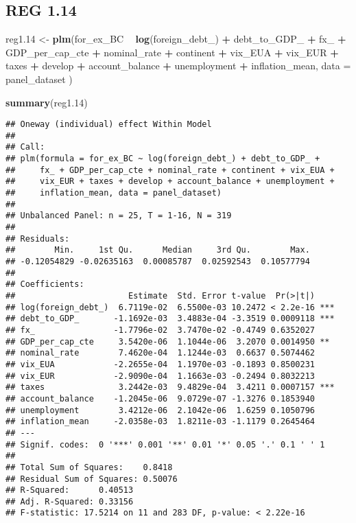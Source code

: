 \documentclass[]{article}
\newenvironment{Shaded}{\begin{snugshade}}{\end{snugshade}}
\newcommand{\KeywordTok}[1]{\textcolor[rgb]{0.13,0.29,0.53}{\textbf{#1}}}
\newcommand{\DataTypeTok}[1]{\textcolor[rgb]{0.13,0.29,0.53}{#1}}
\newcommand{\DecValTok}[1]{\textcolor[rgb]{0.00,0.00,0.81}{#1}}
\newcommand{\StringTok}[1]{\textcolor[rgb]{0.31,0.60,0.02}{#1}}
\newcommand{\OperatorTok}[1]{\textcolor[rgb]{0.81,0.36,0.00}{\textbf{#1}}}
\newcommand{\NormalTok}[1]{#1}
\begin{document}
\subsection{REG 1.14}\label{reg-1.14}

\begin{Shaded}
\begin{Highlighting}[]
\NormalTok{reg1.}\DecValTok{14}\NormalTok{ <-}\StringTok{ }\KeywordTok{plm}\NormalTok{(for_ex_BC }\OperatorTok{~}\StringTok{ }\KeywordTok{log}\NormalTok{(foreign_debt_) }\OperatorTok{+}\StringTok{ }\NormalTok{debt_to_GDP_ }\OperatorTok{+}\StringTok{ }\NormalTok{fx_ }\OperatorTok{+}\StringTok{ }\NormalTok{GDP_per_cap_cte }\OperatorTok{+}\StringTok{ }\NormalTok{nominal_rate }\OperatorTok{+}\StringTok{ }\NormalTok{continent }\OperatorTok{+}\StringTok{ }\NormalTok{vix_EUA }\OperatorTok{+}\StringTok{ }\NormalTok{vix_EUR }\OperatorTok{+}\StringTok{ }\NormalTok{taxes }\OperatorTok{+}\StringTok{ }\NormalTok{develop }\OperatorTok{+}\StringTok{ }\NormalTok{account_balance }\OperatorTok{+}\StringTok{ }\NormalTok{unemployment }\OperatorTok{+}\StringTok{ }\NormalTok{inflation_mean, }\DataTypeTok{data =}\NormalTok{ panel_dataset )}

\KeywordTok{summary}\NormalTok{(reg1.}\DecValTok{14}\NormalTok{)}
\end{Highlighting}
\end{Shaded}

\begin{verbatim}
## Oneway (individual) effect Within Model
## 
## Call:
## plm(formula = for_ex_BC ~ log(foreign_debt_) + debt_to_GDP_ + 
##     fx_ + GDP_per_cap_cte + nominal_rate + continent + vix_EUA + 
##     vix_EUR + taxes + develop + account_balance + unemployment + 
##     inflation_mean, data = panel_dataset)
## 
## Unbalanced Panel: n = 25, T = 1-16, N = 319
## 
## Residuals:
##        Min.     1st Qu.      Median     3rd Qu.        Max. 
## -0.12054829 -0.02635163  0.00085787  0.02592543  0.10577794 
## 
## Coefficients:
##                       Estimate  Std. Error t-value  Pr(>|t|)    
## log(foreign_debt_)  6.7119e-02  6.5500e-03 10.2472 < 2.2e-16 ***
## debt_to_GDP_       -1.1692e-03  3.4883e-04 -3.3519 0.0009118 ***
## fx_                -1.7796e-02  3.7470e-02 -0.4749 0.6352027    
## GDP_per_cap_cte     3.5420e-06  1.1044e-06  3.2070 0.0014950 ** 
## nominal_rate        7.4620e-04  1.1244e-03  0.6637 0.5074462    
## vix_EUA            -2.2655e-04  1.1970e-03 -0.1893 0.8500231    
## vix_EUR            -2.9090e-04  1.1663e-03 -0.2494 0.8032213    
## taxes               3.2442e-03  9.4829e-04  3.4211 0.0007157 ***
## account_balance    -1.2045e-06  9.0729e-07 -1.3276 0.1853940    
## unemployment        3.4212e-06  2.1042e-06  1.6259 0.1050796    
## inflation_mean     -2.0358e-03  1.8211e-03 -1.1179 0.2645464    
## ---
## Signif. codes:  0 '***' 0.001 '**' 0.01 '*' 0.05 '.' 0.1 ' ' 1
## 
## Total Sum of Squares:    0.8418
## Residual Sum of Squares: 0.50076
## R-Squared:      0.40513
## Adj. R-Squared: 0.33156
## F-statistic: 17.5214 on 11 and 283 DF, p-value: < 2.22e-16
\end{verbatim}
\end{document}
